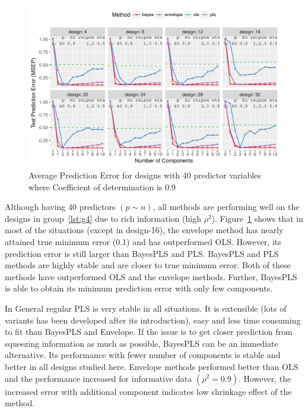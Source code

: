\documentclass[a4paper, 11pt]{article}
\begin{document}
\begin{figure}[!hptb]
  \centering
  \includegraphics[width = \textwidth]{pdf/prediction-error-40-2.pdf}
  \caption[Prediction Error]{Average Prediction Error for designs with 40 predictor
    variables where Coefficient of determination is 0.9}
  \label{fig:pred-error-40-2}
\end{figure}

Although having 40 predictors $(p\sim n)$, all methods are performing well on the designs in group~\ref{lst:g4} due to rich information (high $\rho^2$). Figure~\ref{fig:pred-error-40-2} shows that in most of the situations (except in design-16), the envelope method has nearly attained true minimum error (0.1) and has outperformed OLS. However, its prediction error is still larger than BayesPLS and PLS. BayesPLS and PLS methods are highly stable and are closer to true minimum error. Both of these methods have outperformed OLS and the envelope methods. Further, BayesPLS is able to obtain its minimum prediction error with only few components. 

In General regular PLS is very stable in all situations. It is extensible (lots
of variants has been developed after its introduction), easy and less time
consuming to fit than BayesPLS and Envelope. If the issue is to get closer
prediction from squeezing information as much as possible, BayesPLS can be an
immediate alternative. Its performance with fewer number of components is stable
and better in all designs studied here. Envelope methods performed better than OLS and the performance increased for informative data $(\rho^2 = 0.9)$. However, the
increased error with additional component indicates low shrinkage effect of the
method.
\end{document}
